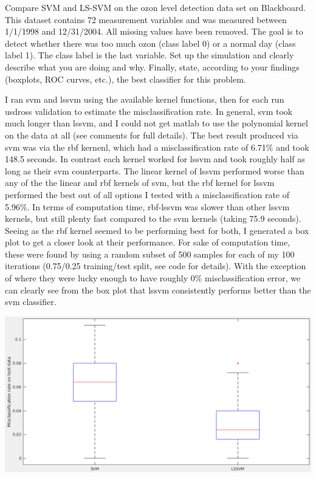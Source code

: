 \documentclass{jhwhw}
\begin{document}
    Compare SVM and LS-SVM on the ozon level detection data set on Blackboard.
    This dataset contains 72 measurement variables and was measured between 1/1/1998 and 12/31/2004.
    All missing values have been removed. The goal is to detect whether there was too much ozon (class label 0)
    or a normal day (class label 1). The class label is the last variable. Set up the simulation and clearly describe what
    you are doing and why. Finally, state, according to your findings (boxplots, ROC curves, etc.), the best
    classifier for this problem.

\solution

    I ran svm and lssvm using the available kernel functions, then for each run usdross validation
    to estimate the misclassification rate. In general, svm took much longer than lssvm, and I could not
    get matlab to use the polynomial kernel on the data at all (see comments for full details).
    The best result produced via svm was via the rbf kernenl, which had a misclassification rate of 6.71\% and took
    148.5 seconds. In contrast each kernel worked for lssvm and took roughly half as long as their svm counterparts.
    The linear kernel of lssvm performed worse than any of the the linear and rbf kernels of svm, but the rbf
    kernel for lssvm performed the best out of all options I tested with a misclassification rate of 5.96\%.
    In terms of computation time, rbf-lssvm was slower than other lssvm kernels, but still plenty fast compared
    to the svm kernels (taking 75.9 seconds). \\
    \bigbreak
    Seeing as the rbf kernel seemed to be performing best for both, I generated a box plot to get a closer look at their 
    performance. For sake of computation time, these were found by using a random subset of 500 samples for each
    of my 100 iterations (0.75/0.25 training/test split, see code for details). With the exception of where
    they were lucky enough to have roughly 0\% misclassification error, we can clearly see from the box plot that
    lssvm consistently performs better than the svm classifier.

    \begin{center}
	\includegraphics[scale=0.4]{p3_boxplot.png}
    \end{center}

    \inputminted[frame=lines,framesep=2mm]{matlab}{p3.m}
\end{document}
